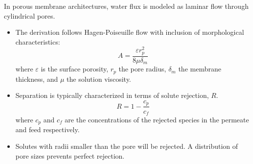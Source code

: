   In porous membrane architectures, water flux is modeled as laminar flow through 
  cylindrical pores.
  \begin{itemize}
    \item The derivation follows Hagen-Poiseuille flow with inclusion of morphological
    characteristics:
    \begin{equation}
      A = \frac{\varepsilon r_p^2}{8\mu\delta_m}
    \end{equation}
    where $\varepsilon$ is the surface porosity, $r_p$ the pore radius, $\delta_m$ the
    membrane thickness, and $\mu$ the solution viscosity.
    \item Separation is typically characterized in terms of solute rejection, $R$. 
    \begin{equation}
      R = 1 - \frac{c_p}{c_f}
    \end{equation}
    where $c_p$ and $c_f$ are the concentrations of the rejected species in
    the permeate and feed respectively.
    \item Solutes with radii smaller than the pore will be rejected. A distribution of 
    pore sizes prevents perfect rejection.
  \end{itemize}
  
